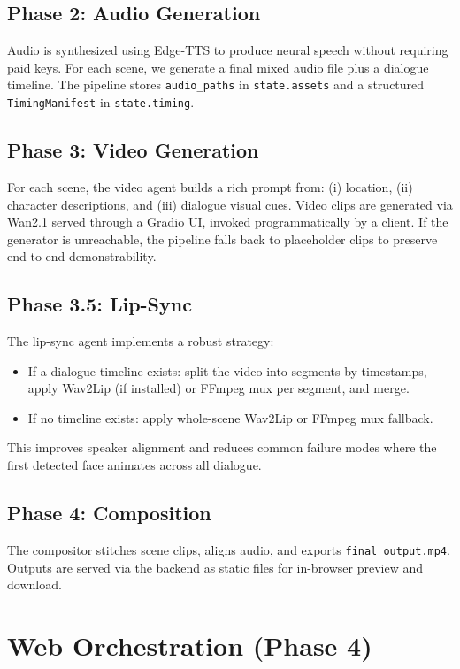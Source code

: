 \documentclass[runningheads]{llncs}
\begin{document}
\subsection{Phase 2: Audio Generation}
Audio is synthesized using Edge-TTS to produce neural speech without requiring paid keys. For each scene, we generate a final mixed audio file plus a dialogue timeline. The pipeline stores \texttt{audio\_paths} in \texttt{state.assets} and a structured \texttt{TimingManifest} in \texttt{state.timing}.

\subsection{Phase 3: Video Generation}
For each scene, the video agent builds a rich prompt from:
(i) location, (ii) character descriptions, and (iii) dialogue visual cues. Video clips are generated via Wan2.1 served through a Gradio UI, invoked programmatically by a client. If the generator is unreachable, the pipeline falls back to placeholder clips to preserve end-to-end demonstrability.

\subsection{Phase 3.5: Lip-Sync}
The lip-sync agent implements a robust strategy:
\begin{itemize}
  \item If a dialogue timeline exists: split the video into segments by timestamps, apply Wav2Lip (if installed) or FFmpeg mux per segment, and merge.
  \item If no timeline exists: apply whole-scene Wav2Lip or FFmpeg mux fallback.
\end{itemize}
This improves speaker alignment and reduces common failure modes where the first detected face animates across all dialogue.

\subsection{Phase 4: Composition}
The compositor stitches scene clips, aligns audio, and exports \texttt{final\_output.mp4}. Outputs are served via the backend as static files for in-browser preview and download.

\section{Web Orchestration (Phase 4)}
\end{document}
